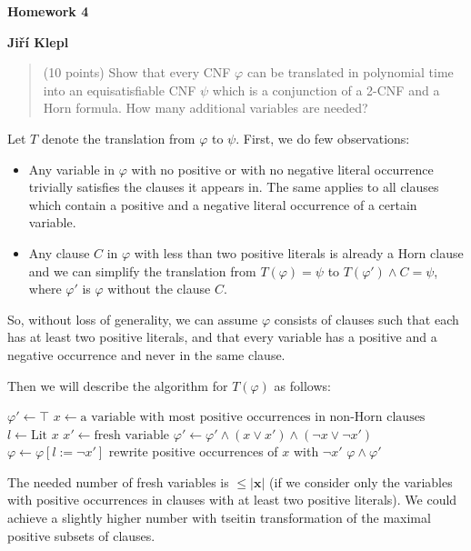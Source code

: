 \documentclass[a4paper,12pt]{article} %
\begin{document}
\begin{center}
    {\Large \bf Homework 4}
    \vspace{2mm}

    {\bf Jiří Klepl}

\end{center}

\vspace{0.4cm}

\begin{quote}
    (10 points) Show that every CNF $\varphi$ can be translated in polynomial time into an equisatisfiable
    CNF $\psi$ which is a conjunction of a 2-CNF and a Horn formula. How many additional variables
    are needed?
\end{quote}

Let $T$ denote the translation from $\varphi$ to $\psi$. First, we do few observations:

\begin{itemize}
    \item
    Any variable in $\varphi$ with no positive or with no negative literal occurrence trivially satisfies the clauses it appears in. The same applies to all clauses which contain a positive and a negative literal occurrence of a certain variable.
    \item
    Any clause $C$ in $\varphi$ with less than two positive literals is already a Horn clause and we can simplify the translation from $T(\varphi) = \psi$ to $T(\varphi') \wedge C = \psi$, where $\varphi'$ is $\varphi$ without the clause $C$.
\end{itemize}

So, without loss of generality, we can assume $\varphi$ consists of clauses such that each has at least two positive literals, and that every variable has a positive and a negative occurrence and never in the same clause.

Then we will describe the algorithm for $T(\varphi)$ as follows:

\begin{algorithmic}[1]
    \State $\varphi' \gets \top$
        \State $x \gets \text{a variable with most positive occurrences in non-Horn clauses}$
        \State $l \gets \text{Lit } x$
        \State $x' \gets \text{fresh variable}$
        \State $\varphi' \gets \varphi' \wedge (x \vee x') \wedge (\neg x \vee \neg x')$
        \State $\varphi \gets \varphi[l := \neg x']$ \Comment rewrite positive occurrences of $x$ with $\neg x'$
    \EndWhile
    \State \Return $\varphi \wedge \varphi'$
    \EndFunction
\end{algorithmic}

The needed number of fresh variables is $\leq|\mathbf{x}|$ (if we consider only the variables with positive occurrences in clauses with at least two positive literals). We could achieve a slightly higher number with tseitin transformation of the maximal positive subsets of clauses.
\end{document}
